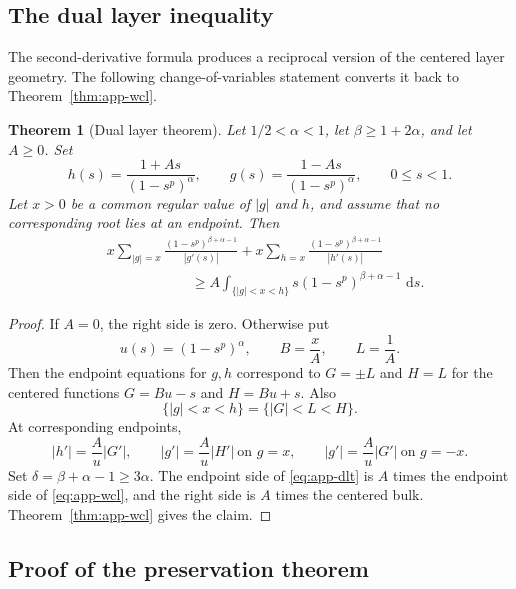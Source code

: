 \documentclass[pdflatex,sn-mathphys-num]{sn-jnl}
\numberwithin{equation}{section}
\theoremstyle{thmstyleone}
\newtheorem{theorem}{Theorem}[section]
\theoremstyle{thmstylethree}
\newcommand{\1}{\mathbf{1}}
\newcommand{\dd}{\,\mathrm{d}}
\begin{document}
\subsection{The dual layer inequality}

The second-derivative formula produces a reciprocal version of the
centered layer geometry. The following change-of-variables statement
converts it back to Theorem~\ref{thm:app-wcl}.

\begin{theorem}[Dual layer theorem]\label{thm:app-dlt}
Let $1/2<\alpha<1$, let $\beta\ge1+2\alpha$, and let $A\ge0$. Set
\[
 h(s)=\frac{1+As}{(1-s^p)^\alpha},
 \qquad
 g(s)=\frac{1-As}{(1-s^p)^\alpha},
 \qquad 0\le s<1.
\]
Let $x>0$ be a common regular value of $|g|$ and $h$, and assume
that no corresponding root lies at an endpoint. Then
\begin{align}\label{eq:app-dlt}
 &x\sum_{|g|=x}\frac{(1-s^p)^{\beta+\alpha-1}}{|g'(s)|}
 +x\sum_{h=x}\frac{(1-s^p)^{\beta+\alpha-1}}{|h'(s)|} \\
 &\hspace{1in}\ge
 A\int_{\{|g|<x<h\}}s(1-s^p)^{\beta+\alpha-1}\,\dd s.
\end{align}
\end{theorem}

\begin{proof}
If $A=0$, the right side is zero. Otherwise put
\[
 u(s)=(1-s^p)^\alpha,
 \qquad
 B=\frac{x}{A},
 \qquad
 L=\frac1A.
\]
Then the endpoint equations for $g,h$ correspond to $G=\pm L$ and $H=L$ for the centered functions $G=Bu-s$ and $H=Bu+s$. Also
\[
 \{|g|<x<h\}=\{|G|<L<H\}.
\]
At corresponding endpoints,
\[
 |h'|=\frac{A}{u}|G'|,
 \qquad
 |g'|=\frac{A}{u}|H'|\ \text{on }g=x,
 \qquad
 |g'|=\frac{A}{u}|G'|\ \text{on }g=-x.
\]
Set $\delta=\beta+\alpha-1\ge3\alpha$. The endpoint side of \eqref{eq:app-dlt} is $A$ times the endpoint side of \eqref{eq:app-wcl}, and the right side is $A$ times the centered bulk. Theorem~\ref{thm:app-wcl} gives the claim.
\end{proof}
\subsection{Proof of the preservation theorem}
\end{document}
